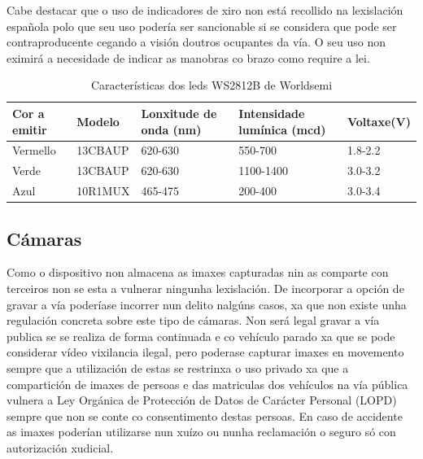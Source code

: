 Cabe destacar que o uso de indicadores de xiro non está recollido na lexislación española polo que seu uso podería ser sancionable si se considera que pode ser contraproducente cegando a visión doutros ocupantes da vía. O seu uso non eximirá a necesidade de indicar as manobras co brazo como require a lei.
\begin{table}[tb]
  \caption{Características dos leds WS2812B de Worldsemi}
    \label{tab:intensidade_leds}
    \begin{center}
        \begin{tabular}{|l|l|l|l|l|}
            \hline
             Cor a emitir & Modelo & Lonxitude de onda (nm) & Intensidade lumínica (mcd)&Voltaxe(V)\\ \hline
             Vermello & 13CBAUP & 620-630 & 550-700 & 1.8-2.2\\ \hline
             Verde & 13CBAUP & 620-630 & 1100-1400 & 3.0-3.2\\ \hline
             Azul & 10R1MUX & 465-475 & 200-400 & 3.0-3.4\\ \hline
        \end{tabular}
    \end{center}
\end{table}

\subsection{Cámaras}

Como o dispositivo non almacena as imaxes capturadas nin as comparte con terceiros non se esta a vulnerar ningunha lexislación. De incorporar a opción de gravar a vía poderíase incorrer nun delito nalgúns casos, xa que non existe unha regulación concreta sobre este tipo de cámaras.
 Non será legal gravar a vía publica se se realiza de forma continuada e co vehículo parado xa que se pode considerar vídeo vixilancia ilegal, pero poderase capturar imaxes en movemento sempre que a utilización de estas se restrinxa o uso privado xa que a compartición de imaxes de persoas e das matriculas dos vehículos na vía pública vulnera a Ley Orgánica de Protección de Datos de Carácter Personal (LOPD)~\cite{BOEEsDocumento} sempre que non se conte co consentimento destas persoas. En caso de accidente as imaxes poderían utilizarse nun xuízo ou nunha reclamación o seguro só con autorización xudicial.
